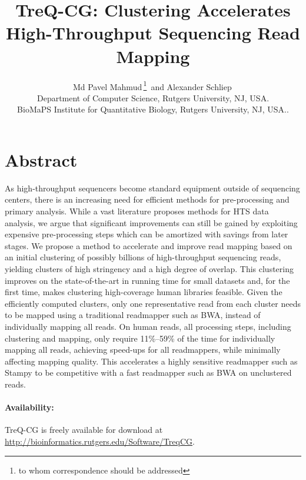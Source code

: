 \documentclass[a4paper]{article}
\begin{document}
\title{TreQ-CG: Clustering Accelerates High-Throughput Sequencing Read Mapping}

\author[Mahmud and Schliep]{Md Pavel Mahmud\,\footnote{to whom correspondence should be addressed}\, and Alexander Schliep\, \\
Department of Computer Science, Rutgers University, NJ, USA.\\
BioMaPS Institute for Quantitative Biology, Rutgers University, NJ, USA..}


\maketitle


\section{Abstract}

  As high-throughput sequencers become standard
  equipment outside of sequencing centers, there is an increasing need
  for efficient methods for pre-processing
  and
  primary analysis.
  While a vast literature proposes methods for
  HTS data analysis, we argue that significant improvements can
  still be gained by
  exploiting expensive pre-processing steps which can be amortized with
  savings from later stages.
  We propose a method
  to accelerate and improve read mapping
  based on an initial
  clustering of possibly billions of high-throughput sequencing reads,
  yielding clusters of high stringency and a high degree of overlap.
  This clustering improves on the state-of-the-art in running time
  for small datasets and, for the first time, makes
  clustering high-coverage human libraries feasible.
  Given the
  efficiently
  computed clusters, only one representative read
  from each cluster needs to be mapped using a traditional readmapper
  such as BWA, instead of individually mapping all reads.
        On human reads, all processing
  steps, including clustering and mapping, only require 11\%--59\% of the
  time for individually mapping all reads,
  achieving speed-ups for all readmappers,
  while minimally affecting mapping quality.
  This accelerates a
  highly sensitive readmapper such as Stampy to be competitive with
  a fast readmapper such as BWA on unclustered reads.

\paragraph{Availability:}
        TreQ-CG is freely available for download at
  \url{http://bioinformatics.rutgers.edu/Software/TreqCG}.
\end{document}
